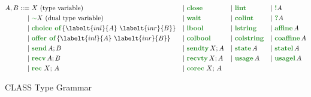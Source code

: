 \begin{figure}
    \centering
    \[\begin{aligned}
        A, B ::=\  & X \text{ (type variable)}              &  & |\ \closet &  & |\ \lintt  & & |\ \bangt{A} \\
        |\         & \dualt{X} \text{ (dual type variable)} &  & |\ \waitt &  & |\ \colintt & & |\ \whynott{A} \\
        |\         & \choicet{\labelt{inl}{A}\ \labelt{inr}{B}} & & |\ \lboolt & & |\ \lstringt & & |\ \affinet{A} \\
        |\         & \offert{\labelt{inl}{A}\ \labelt{inr}{B}} & & |\ \colboolt & & |\ \colstringt & & |\ \coaffinet{A} \\
        |\         & \sendt{A}{B}  & & |\ \sendtyt{X}{A} & & |\ \statet{A} & & |\ \statelt{A} \\
        |\         & \recvt{A}{B} & & |\ \recvtyt{X}{A} & & |\ \usaget{A} & & |\ \usagelt{A} \\
        |\         & \rect{X}{A}  & & |\ \corect{X}{A}   \\ 
    \end{aligned}\]
    \caption{CLASS Type Grammar}
    \label{fig:CLASSTypesGrammar}
\end{figure}

